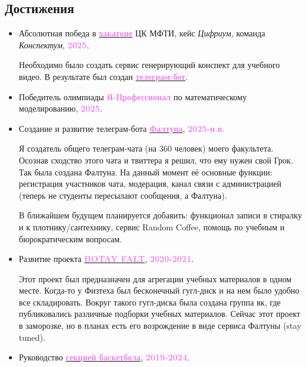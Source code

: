 \documentclass[a4paper,12pt]{article}
\begin{document}
	\subsection*{Достижения}
	\begin{itemize}
	\item[\textcolor{violet}{\faTrophy}] Абсолютная победа в \href{https://www.figma.com/board/JqewkyeKxGNv3K8oA2SAdw}{\textcolor{violet}{\textbf{хакатоне}}} ЦК МФТИ, кейс \textit{Цифриум}, команда \textit{Конспектум}, \textcolor{violet}{\textbf{2025}}.
	
	Необходимо было создать сервис генерирующий конспект для учебного видео. В результате был создан \href{https://github.com/alex-petrov-git/konspektum}{\textcolor{violet}{\textbf{телеграм-бот}}}. 
	
	\item[\textcolor{violet}{\faTrophy}] Победитель олимпиады \textcolor{violet}{\textbf{Я-Профессионал}} по математическому моделированию, \textcolor{violet}{\textbf{2025}}.
	
	\item[\textcolor{violet}{\faRocket}] Создание и развитие телеграм-бота \href{https://t.me/faltuna_bot}{\textcolor{violet}{\textbf{Фалтуна}}}, \textcolor{violet}{\textbf{2025-н.в.}}
	
	Я создатель общего телеграм-чата (на 360 человек) моего факультета. Осознав сходство этого чата и твиттера я решил, что ему нужен свой Грок. Так была создана Фалтуна. На данный момент её основные функции: регистрация участников чата, модерация, канал связи с администрацией (теперь не студенты пересылают сообщения, а Фалтуна). 
	
	В ближайшем будущем планируется добавить: функционал записи в стиралку и к плотнику/сантехнику, сервис Random Coffee, помощь по учебным и бюрократическим вопросам.
	
	\item[\textcolor{violet}{\faRocket}] Развитие проекта \href{https://vk.com/botay_falt}{\textcolor{violet}{\textbf{BOTAY FALT}}}, \textcolor{violet}{\textbf{2020-2021}}.
	
	Этот проект был предназначен для агрегации учебных материалов в одном месте. Когда-то у Физтеха был бесконечный гугл-диск и на нем было удобно все складировать. Вокруг такого гугл-диска была создана группа вк, где публиковались различные подборки учебных материалов. Сейчас этот проект в заморозке, но в планах есть его возрождение в виде сервиса Фалтуны (stay tuned).
	
	\item[\textcolor{violet}{\faHeart}] Руководство \href{https://t.me/falt_basket}{\textcolor{violet}{\textbf{секцией баскетбола}}}, \textcolor{violet}{\textbf{2019-2024}}.
	

\end{itemize}
\end{document}
